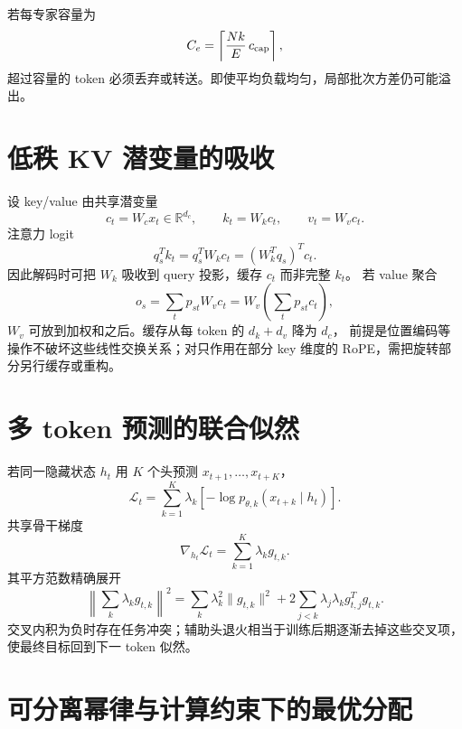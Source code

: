 \documentclass[11pt]{article}
\numberwithin{equation}{section}
\newcommand{\R}{\mathbb{R}}
\newcommand{\1}{\mathbf{1}}
\newcommand{\cL}{\mathcal{L}}
\begin{document}
若每专家容量为
\begin{equation}
 C_e=\left\lceil\frac{Nk}{E}\,c_{\rm cap}\right\rceil,
\end{equation}
超过容量的 token 必须丢弃或转送。即使平均负载均匀，局部批次方差仍可能溢出。

\section{低秩 KV 潜变量的吸收}

设 key/value 由共享潜变量
\begin{equation}
 c_t=W_cx_t\in\R^{d_c},\qquad
 k_t=W_kc_t,\qquad v_t=W_vc_t.
\end{equation}
注意力 logit
\begin{equation}
 q_s^Tk_t=q_s^TW_kc_t=(W_k^Tq_s)^Tc_t.
\end{equation}
因此解码时可把 $W_k$ 吸收到 query 投影，缓存 $c_t$ 而非完整 $k_t$。
若 value 聚合
\begin{equation}
 o_s=\sum_tp_{st}W_vc_t=W_v\left(\sum_tp_{st}c_t\right),
\end{equation}
$W_v$ 可放到加权和之后。缓存从每 token 的 $d_k+d_v$ 降为 $d_c$，
前提是位置编码等操作不破坏这些线性交换关系；对只作用在部分 key 维度的 RoPE，需把旋转部分另行缓存或重构。

\section{多 token 预测的联合似然}

若同一隐藏状态 $h_t$ 用 $K$ 个头预测 $x_{t+1},\ldots,x_{t+K}$，
\begin{equation}
 \cL_t=\sum_{k=1}^{K}\lambda_k
 [-\log p_{\theta,k}(x_{t+k}\mid h_t)].
\end{equation}
共享骨干梯度
\begin{equation}
 \nabla_{h_t}\cL_t=\sum_{k=1}^{K}\lambda_k g_{t,k}.
\end{equation}
其平方范数精确展开
\begin{equation}
 \left\|\sum_k\lambda_kg_{t,k}\right\|^2
 =\sum_k\lambda_k^2\|g_{t,k}\|^2
 +2\sum_{j<k}\lambda_j\lambda_k g_{t,j}^Tg_{t,k}.
\end{equation}
交叉内积为负时存在任务冲突；辅助头退火相当于训练后期逐渐去掉这些交叉项，
使最终目标回到下一 token 似然。

\section{可分离幂律与计算约束下的最优分配}
\end{document}
